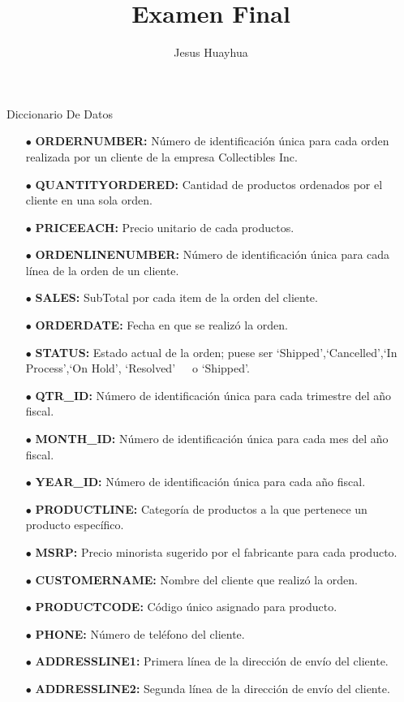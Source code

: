 \documentclass[a4paper]{article}
\title{Examen Final}
\author{Jesus Huayhua}
\begin{document}
  
  \newpage
  \begin{center}
    \LARGE Diccionario De Datos
  \end{center}
  \begin{itemize}
    \item [$\bullet$] \textbf{ORDERNUMBER:} Número de identificación única para cada orden realizada por un cliente de la empresa Collectibles Inc.
    \item [$\bullet$] \textbf{QUANTITYORDERED:} Cantidad de productos ordenados por el cliente en una sola orden.
    \item [$\bullet$] \textbf{PRICEEACH:} Precio unitario de cada productos.
    \item [$\bullet$] \textbf{ORDENLINENUMBER:} Número de identificación única para cada línea de la orden de un cliente.
    \item [$\bullet$] \textbf{SALES:} SubTotal por cada item de la orden del cliente.
    \item [$\bullet$] \textbf{ORDERDATE:} Fecha en que se realizó la orden.
\item [$\bullet$] \textbf{STATUS:}  Estado actual de la orden; puese ser `Shipped',`Cancelled',`In Process',`On Hold', `Resolved'\ \ \ o `Shipped'.
    \item [$\bullet$] \textbf{QTR\_ID:} Número de identificación única para cada trimestre del año fiscal.
    \item [$\bullet$] \textbf{MONTH\_ID:} Número de identificación única para cada mes del año fiscal.
    \item [$\bullet$] \textbf{YEAR\_ID:} Número de identificación única para cada año fiscal.
    \item [$\bullet$] \textbf{PRODUCTLINE:} Categoría de productos a la que pertenece un producto específico.
    \item [$\bullet$] \textbf{MSRP:} Precio minorista sugerido por el fabricante para cada producto.
    \item [$\bullet$] \textbf{CUSTOMERNAME:} Nombre del cliente que realizó la orden.
    \item [$\bullet$] \textbf{PRODUCTCODE:} Código único asignado para producto.
    \item [$\bullet$] \textbf{PHONE:} Número de teléfono del cliente.
    \item [$\bullet$] \textbf{ADDRESSLINE1:} Primera línea de la dirección de envío del cliente.
    \item [$\bullet$] \textbf{ADDRESSLINE2:} Segunda línea de la dirección de envío del cliente.

\end{itemize}
\end{document}
